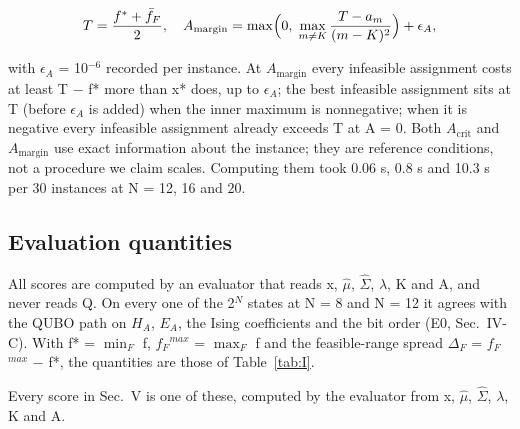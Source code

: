 \documentclass{ieeeaccess}
\begin{document}
\begin{equation*}
T = \frac{f^{*} + \bar{f}_F}{2},\quad A_{\mathrm{margin}} = \max\Bigl(0,\; \max_{m \neq K} \frac{T - a_m}{(m-K)^2}\Bigr) + \epsilon_A,
\end{equation*}


with $\epsilon_{A}$ = 10$^{-6}$ recorded per instance. At $A_{\mathrm{margin}}$ every infeasible assignment costs at least T $-$ f* more than x* does, up to $\epsilon_{A}$; the best infeasible assignment sits at T (before $\epsilon_{A}$ is added) when the inner maximum is nonnegative; when it is negative every infeasible assignment already exceeds T at A = 0. Both $A_{\mathrm{crit}}$ and $A_{\mathrm{margin}}$ use exact information about the instance; they are reference conditions, not a procedure we claim scales. Computing them took 0.06 s, 0.8 s and 10.3 s per 30 instances at N = 12, 16 and 20.


\subsection{Evaluation quantities}


All scores are computed by an evaluator that reads x, $\hat{\mu}$, $\hat{\Sigma}$, $\lambda$, K and A, and never reads Q. On every one of the 2$^{N}$ states at N = 8 and N = 12 it agrees with the QUBO path on $H_{A}$, $E_{A}$, the Ising coefficients and the bit order (E0, Sec.~IV-C). With f* = $\min_{F}$ f, $f_{F}$$^{max}$ = $\max_{F}$ f and the feasible-range spread $\Delta_{F}$ = $f_{F}$$^{max}$ $-$ f*, the quantities are those of Table~\ref{tab:I}.


Every score in Sec.~V is one of these, computed by the evaluator from x, $\hat{\mu}$, $\hat{\Sigma}$, $\lambda$, K and A.
\end{document}
